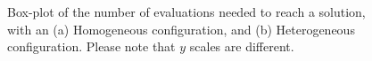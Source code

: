 \documentclass[conference]{IEEEtran}
\begin{document}
\begin{figure}[t]
    \centering


    \caption{Box-plot of the number
      of evaluations needed to reach a solution, with an (a)
      Homogeneous configuration, and (b) Heterogeneous
      configuration. Please note that $y$ scales are different.}
    \label{fig:schaffer}
\end{figure}
%
\end{document}
